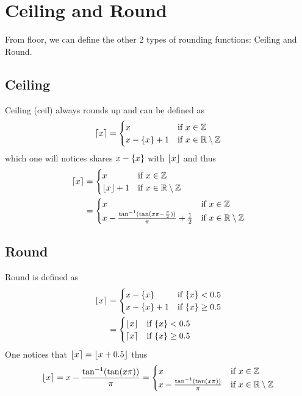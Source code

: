 \documentclass[11pt]{article}
\DeclarePairedDelimiter\ceil{\lceil}{\rceil}
\DeclarePairedDelimiter\floor{\lfloor}{\rfloor}
\DeclarePairedDelimiter\round{\lfloor}{\rceil}
\DeclarePairedDelimiter\fractional{\{}{\}}
\begin{document}
\section{Ceiling and Round}
From floor, we can define the other 2 types of rounding functions: Ceiling and Round.
\subsection{Ceiling}
Ceiling (ceil) always rounds up and can be defined as
\begin{gather*}
\ceil*{x}=\begin{cases}
x & \text{if } x \in \mathbb{Z}\\
x-\fractional*{x}+1 & \text{if } x \in \mathbb{R}\setminus\mathbb{Z}
\end{cases}
\end{gather*}
which one will notices shares \(x-\fractional*{x}\) with \(\floor*{x}\) and thus
\begin{equation*}
\begin{split}
\ceil*{x}&=\begin{cases}
x & \text{if } x \in \mathbb{Z}\\
\floor*{x}+1 & \text{if } x \in \mathbb{R}\setminus\mathbb{Z}
\end{cases}\\
&=\begin{cases}
x & \text{if } x \in \mathbb{Z}\\
x-\frac{\tan^{\mathrm{-1}}(\tan(x\pi-\frac{\pi}{2}))}{\pi}+\frac{1}{2} & \text{if } x \in \mathbb{R}\setminus\mathbb{Z}\\
\end{cases}
\end{split}
\end{equation*}
\subsection{Round}
Round is defined as
\begin{equation*}
\begin{split}
\round*{x}&=\begin{cases}
x - \fractional*{x} & \text{if } \fractional*{x} < 0.5\\
x-\fractional*{x}+1 & \text{if } \fractional*{x} \geq 0.5
\end{cases}\\
&=\begin{cases}
\floor*{x} & \text{if } \fractional*{x} < 0.5\\
\ceil*{x} & \text{if } \fractional*{x} \geq 0.5
\end{cases}
\end{split}
\end{equation*}
One notices that \(\round*{x}=\floor*{x+0.5}\) thus
\begin{equation*}
\round*{x}=x-\frac{\tan^{\mathrm{-1}}(\tan(x\pi))}{\pi}=\begin{cases}
x & \text{if } x \in \mathbb{Z}\\
x-\frac{\tan^{\mathrm{-1}}(\tan(x\pi))}{\pi} & \text{if } x \in \mathbb{R}\setminus\mathbb{Z}\\
\end{cases}
\end{equation*}
\end{document}
